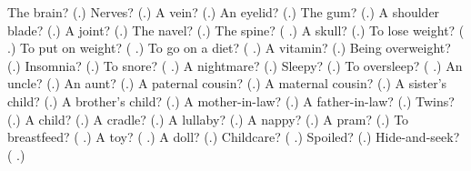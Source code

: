 \begin{tcolorbox}[breakable,colback=teal!4,colframe=teal!35!black,title={Before you move on}]
The brain? (\textbf{}.) Nerves? (\textbf{}.) A vein? (\textbf{}.) An eyelid? (\textbf{}.) The gum? (\textbf{}.) A shoulder blade? (\textbf{}.) A joint? (\textbf{}.) The navel? (\textbf{}.) The spine? (\textbf{ }.) A skull? (\textbf{}.) To lose weight? (\textbf{ }.) To put on weight? (\textbf{ }.) To go on a diet? (\textbf{ }.) A vitamin? (\textbf{}.) Being overweight? (\textbf{}.) Insomnia? (\textbf{}.) To snore? (\textbf{ }.) A nightmare? (\textbf{}.) Sleepy? (\textbf{}.) To oversleep? (\textbf{ }.) An uncle? (\textbf{}.) An aunt? (\textbf{}.) A paternal cousin? (\textbf{}.) A maternal cousin? (\textbf{}.) A sister's child? (\textbf{}.) A brother's child? (\textbf{}.) A mother-in-law? (\textbf{}.) A father-in-law? (\textbf{}.) Twins? (\textbf{}.) A child? (\textbf{}.) A cradle? (\textbf{}.) A lullaby? (\textbf{}.) A nappy? (\textbf{}.) A pram? (\textbf{}.) To breastfeed? (\textbf{ }.) A toy? (\textbf{ }.) A doll? (\textbf{}.) Childcare? (\textbf{ }.) Spoiled? (\textbf{}.) Hide-and-seek? (\textbf{ }.)
\end{tcolorbox}
